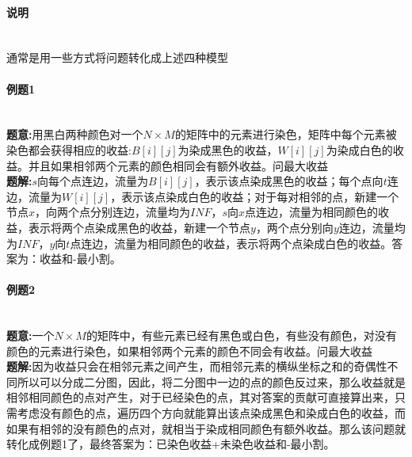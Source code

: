 \paragraph{说明}~{}
\\
通常是用一些方式将问题转化成上述四种模型
\paragraph{例题1}~{
    \\
    \textbf{题意:}用黑白两种颜色对一个$N \times M$的矩阵中的元素进行染色，矩阵中每个元素被染色都会获得相应的收益:$B[i][j]$为染成黑色的收益，$W[i][j]$为染成白色的收益。并且如果相邻两个元素的颜色相同会有额外收益。问最大收益
    \\
    \textbf{题解:}$s$向每个点连边，流量为$B[i][j]$，表示该点染成黑色的收益；每个点向$t$连边，流量为$W[i][j]$，表示该点染成白色的收益；对于每对相邻的点，新建一个节点$x$，向两个点分别连边，流量均为$INF$，$s$向$x$点连边，流量为相同颜色的收益，表示将两个点染成黑色的收益，新建一个节点$y$，两个点分别向$y$连边，流量均为$INF$，$y$向$t$点连边，流量为相同颜色的收益，表示将两个点染成白色的收益。答案为：收益和-最小割。
}
\paragraph{例题2}~{
    \\
    \textbf{题意:}一个$N \times M$的矩阵中，有些元素已经有黑色或白色，有些没有颜色，对没有颜色的元素进行染色，如果相邻两个元素的颜色不同会有收益。问最大收益\\
    \textbf{题解:}因为收益只会在相邻元素之间产生，而相邻元素的横纵坐标之和的奇偶性不同所以可以分成二分图，因此，将二分图中一边的点的颜色反过来，那么收益就是相邻相同颜色的点对产生，对于已经染色的点，其对答案的贡献可直接算出来，只需考虑没有颜色的点，遍历四个方向就能算出该点染成黑色和染成白色的收益，而如果有相邻的没有颜色的点对，就相当于染成相同颜色有额外收益。那么该问题就转化成例题1了，最终答案为：已染色收益+未染色收益和-最小割。 
}
